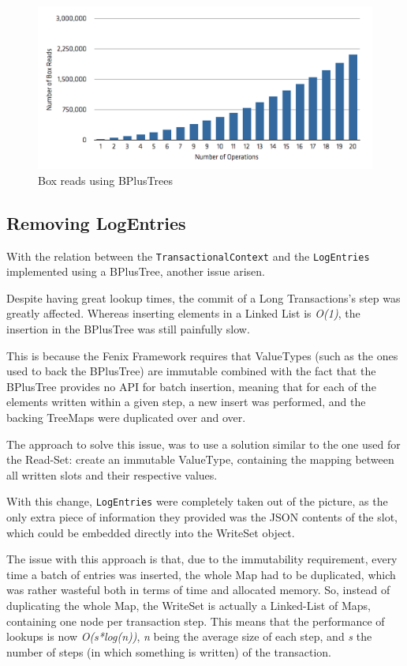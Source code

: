 \documentclass{llncs}
\begin{document}
\begin{figure}
\centering
\includegraphics[width=0.9\linewidth]{box-long-bplus}
\caption{Box reads using BPlusTrees}
\label{fig:boxesBPlus}
\end{figure}


\subsection{Removing LogEntries}

With the relation between the \texttt{TransactionalContext} and the
\texttt{LogEntries} implemented using a BPlusTree, another issue
arisen.

Despite having great lookup times, the commit of a Long Transactions's
step was greatly affected. Whereas inserting elements in a Linked List
is {\it O(1)}, the insertion in the BPlusTree was still painfully
slow.

This is because the Fenix Framework requires that ValueTypes (such as
the ones used to back the BPlusTree) are immutable combined with the
fact that the BPlusTree provides no API for batch insertion, meaning
that for each of the elements written within a given step, a new
insert was performed, and the backing TreeMaps were duplicated over
and over. 

The approach to solve this issue, was to use a solution similar to the
one used for the Read-Set: create an immutable ValueType, containing
the mapping between all written slots and their respective values.

With this change, \texttt{LogEntries} were completely taken out of the
picture, as the only extra piece of information they provided was the
JSON contents of the slot, which could be embedded directly into the
WriteSet object.

The issue with this approach is that, due to the immutability
requirement, every time a batch of entries was inserted, the whole Map
had to be duplicated, which was rather wasteful both in terms of time
and allocated memory. So, instead of duplicating the whole Map, the
WriteSet is actually a Linked-List of Maps, containing one node per
transaction step. This means that the performance of lookups is now
{\it O(s*log(n))}, {\it n} being the average size of each step, and
{\it s} the number of steps (in which something is written) of the
transaction.
\end{document}
